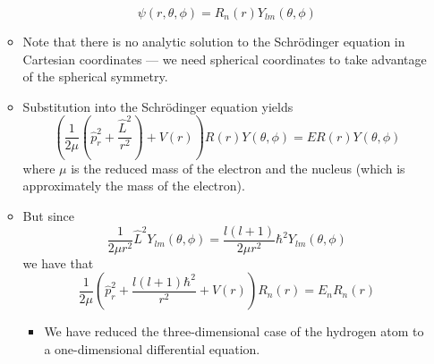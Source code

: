 \documentclass[../notes.tex]{subfiles}
\begin{document}
\begin{itemize}
\begin{itemize}
        \begin{equation*}
            \psi(r,\theta,\phi) = R_n(r)Y_{lm}(\theta,\phi)
        \end{equation*}
        \item Note that there is no analytic solution to the Schr\"{o}dinger equation in Cartesian coordinates --- we need spherical coordinates to take advantage of the spherical symmetry.
        \item Substitution into the Schr\"{o}dinger equation yields
        \begin{equation*}
            \left( \frac{1}{2\mu}\left( \hat{p}_r^2+\frac{\hat{L}^2}{r^2} \right)+V(r) \right)R(r)Y(\theta,\phi) = ER(r)Y(\theta,\phi)
        \end{equation*}
        where $\mu$ is the reduced mass of the electron and the nucleus (which is approximately the mass of the electron).
        \item But since
        \begin{equation*}
            \frac{1}{2\mu r^2}\hat{L}^2Y_{lm}(\theta,\phi) = \frac{l(l+1)}{2\mu r^2}\hbar^2Y_{lm}(\theta,\phi)
        \end{equation*}
        we have that
        \begin{equation*}
            \frac{1}{2\mu}\left( \hat{p}_r^2+\frac{l(l+1)\hbar^2}{r^2}+V(r) \right)R_n(r) = E_nR_n(r)
        \end{equation*}
        \begin{itemize}
            \item We have reduced the three-dimensional case of the hydrogen atom to a one-dimensional differential equation.
        \end{itemize}
    \end{itemize}
\end{itemize}
\end{document}
